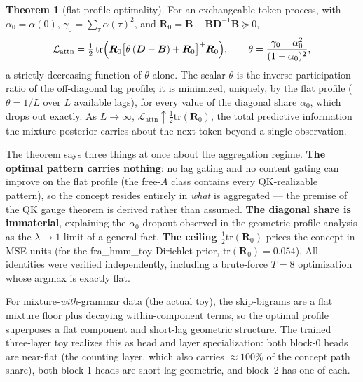 \documentclass{article}
\newcommand{\Bb}{\boldsymbol{B}}
\newcommand{\Db}{\boldsymbol{D}}
\newcommand{\Rb}{\boldsymbol{R}}
\newcommand{\tr}{\textrm{tr}}
\newcommand{\lattn}{\mathcal{L}_{\text{attn}}}
\theoremstyle{definition}
\newtheorem{theorem}{Theorem}[section]
\begin{document}
\begin{theorem}[flat-profile optimality]\label{thm:flat}
For an exchangeable token process, with $\alpha_0 = \alpha(0)$,
$\gamma_0 = \sum_\tau \alpha(\tau)^2$, and $\Rb_0 = \Bb - \Bb\Db^{-1}\Bb
\succeq 0$,
\begin{equation}\label{lattntheta}
\lattn = \tfrac12\, \tr\Bigl( \Rb_0 \bigl[\theta\,(\Db - \Bb) + \Rb_0
\bigr]^{+} \Rb_0 \Bigr),
\qquad
\theta = \frac{\gamma_0 - \alpha_0^2}{(1-\alpha_0)^2},
\end{equation}
a strictly decreasing function of $\theta$ alone. The scalar $\theta$ is the
inverse participation ratio of the off-diagonal lag profile; it is minimized,
uniquely, by the flat profile ($\theta = 1/L$ over $L$ available lags), for
every value of the diagonal share $\alpha_0$, which drops out exactly. As
$L \to \infty$, $\lattn \uparrow \tfrac12 \tr(\Rb_0)$, the total predictive
information the mixture posterior carries about the next token beyond a
single observation.
\end{theorem}

The theorem says three things at once about the aggregation regime.
\textbf{The optimal pattern carries nothing}: no lag gating and no content
gating can improve on the flat profile (the free-$A$ class contains every
QK-realizable pattern), so the concept resides entirely in \emph{what} is
aggregated --- the premise of the QK gauge theorem is derived rather than
assumed. \textbf{The diagonal share is immaterial}, explaining the
$\alpha_0$-dropout observed in the geometric-profile analysis as the
$\lambda \to 1$ limit of a general fact. \textbf{The ceiling
$\tfrac12\tr(\Rb_0)$} prices the concept in MSE units (for the fra\_hmm\_toy
Dirichlet prior, $\tr(\Rb_0) = 0.054$). All identities were verified
independently, including a brute-force $T = 8$ optimization whose argmax is
exactly flat.

For mixture-\emph{with}-grammar data (the actual toy), the skip-bigrams are
a flat mixture floor plus decaying within-component terms, so the optimal
profile superposes a flat component and short-lag geometric structure. The
trained three-layer toy realizes this as head and layer specialization:
both block-0 heads are near-flat (the counting layer, which also carries
$\approx 100\%$ of the concept path share), both block-1 heads are
short-lag geometric, and block~2 has one of each.
\end{document}
